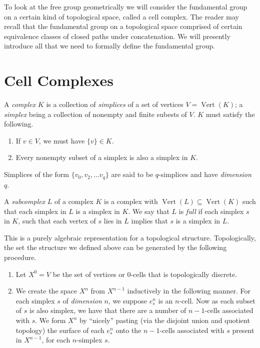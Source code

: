To look at the free group geometrically we will consider the fundamental group on a certain kind of topological space, called a cell complex. The reader may recall that the fundamental group on a topological space comprised of certain equivalence classes of closed paths under concatenation. We will presently introduce all that we need to formally define the fundamental group.

\section{Cell Complexes}

\begin{definition}
  A \emph{complex} $K$ is a collection of \emph{simplices} of a set of vertices $V=\operatorname{Vert}(K)$; a \emph{simplex} being a collection of nonempty and finite subests of $V$. $K$ must satisfy the following.
  \begin{enumerate}
  \item If $v \in V$, we must have $\{v \} \in K$.
  \item Every nonempty subset of a simplex is also a simplex in $K$.
  \end{enumerate}
  Simplices of the form $\{ v_0, v_2, \dots v_q \}$ are said to be $q$-simplices and have \emph{dimension} $q$.
\end{definition}

\begin{definition}
  A \emph{subcomplex} $L$ of a complex $K$ is a complex with $\operatorname{Vert}(L) \subseteq \operatorname{Vert}(K)$ such that each simplex in $L$ is a simplex in $K$. We say that $L$ is \emph{full} if each simplex $s$ in $K$, such that each vertex of $s$ lies in $L$ implies that $s$ is a simplex in $L$.
\end{definition}

This is a purely algebraic representation for a topological structure. Topologically, the set the structure we defined above can be generated by the following procedure.

\begin{enumerate}
\item Let $X^0 = V$ be the set of vertices or $0$-cells that is topologically discrete.
\item We create the space $X^n$ from $X^{n-1}$ inductively in the following manner. For each simplex $s$ of \emph{dimension} $n$, we suppose $e_{s}^n$ is an $n$-cell. Now as each subset of $s$ is also simplex, we have that there are a number of $n-1$-cells associated with $s$. We form $X^n$ by ``nicely'' pasting (via the disjoint union and quotient topology) the surface of each $e^n_s$ onto the $n-1$-cells associated with $s$ present in $X^{n-1}$, for each $n$-simplex $s$.
\end{enumerate}

